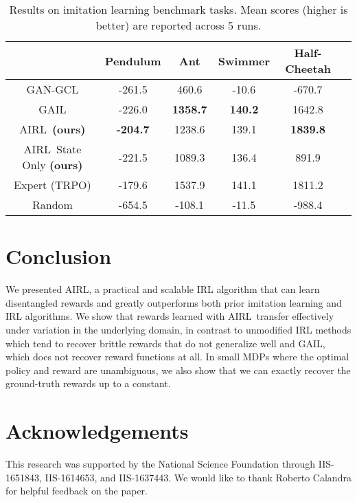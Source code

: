 \documentclass{article} \usepackage{iclr2018_conference,times}
\newcommand{\algnameabbrev}{AIRL}
\begin{document}
\begin{table}[H]
\caption{Results on imitation learning benchmark tasks. Mean scores (higher is better)  are reported across 5 runs.}
\label{tbl:imitation_results}
\begin{center}
\begin{tabular}{c|ccccc}
\hline
& Pendulum & Ant & Swimmer & Half-Cheetah \\
\hline
GAN-GCL & -261.5 &  460.6 & -10.6 &  -670.7 \\
\hdashline
GAIL &  -226.0 &  \textbf{1358.7} & \textbf{140.2} &  1642.8\\
\hdashline
\algnameabbrev\ \textbf{(ours)} & \textbf{-204.7} &  1238.6 & 139.1 & \textbf{1839.8}\\
\hdashline
\algnameabbrev\ State Only \textbf{(ours)} & -221.5 &  1089.3 & 136.4 & 891.9\\
\hline
Expert (TRPO) & -179.6 &  1537.9 & 141.1 &  1811.2 \\
\hdashline
Random & -654.5 &  -108.1 & -11.5 &  -988.4 \\
\hline
\end{tabular}
\end{center}
\end{table}
 
\section{Conclusion}
We presented \algnameabbrev, a practical and scalable IRL algorithm that can learn disentangled rewards and greatly outperforms both prior imitation learning and IRL algorithms. We show that rewards learned with \algnameabbrev\ transfer effectively under variation in the underlying domain, in contrast to unmodified IRL methods which tend to recover brittle rewards that do not generalize well and GAIL, which does not recover reward functions at all. In small MDPs where the optimal policy and reward are unambiguous, we also show that we can exactly recover the ground-truth rewards up to a constant.



 
\section*{Acknowledgements}
This research was supported by the National Science Foundation through IIS-1651843, IIS-1614653, and IIS-1637443. We would like to thank Roberto Calandra for helpful feedback on the paper.




\end{document}
